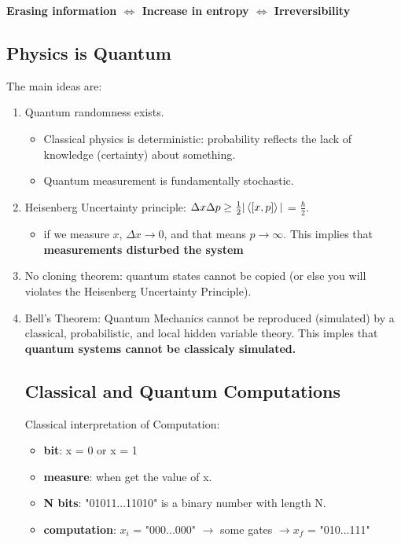\documentclass[12pt]{article}
\begin{document}
\textbf{\color{Orchid} Erasing information $\Longleftrightarrow$ Increase in entropy $\Longleftrightarrow$ Irreversibility}

\subsection{Physics is Quantum}

The main ideas are:
\begin{enumerate}
    \item Quantum randomness exists.
    \begin{itemize}
        \item Classical physics is deterministic: probability reflects the lack of knowledge (certainty) about something.
        \item Quantum measurement is fundamentally stochastic.
    \end{itemize}
    \item Heisenberg Uncertainty principle: $\Delta x \Delta p \ge \frac{1}{2}|\braket{[x, p]}|$ = $\frac{\hbar}{2}$.
    \begin{itemize}
        \item if we measure $x$, $\Delta x \rightarrow{} 0$, and that means $p \xrightarrow{} \infty$. This implies that \textbf{\color{Orchid} measurements disturbed the system}
    \end{itemize}
    \item No cloning theorem: quantum states cannot be copied (or else you will violates the Heisenberg Uncertainty Principle).
    \item Bell's Theorem: Quantum Mechanics cannot be reproduced (simulated) by a classical, probabilistic, and local hidden variable theory. This imples that \textbf{\color{Orchid} quantum systems cannot be classicaly simulated.}

\subsection{Classical and Quantum Computations}
Classical interpretation of Computation:
\begin{itemize}
    \item \textbf{bit}: x = 0 or x = 1
    \item \textbf{measure}: when get the value of x.
    \item \textbf{N bits}: "01011...11010" is a binary number with length N.
    \item \textbf{computation}: $x_i$ = "000...000" $\rightarrow{}$ some gates $\rightarrow{} x_f$ = "010...111"
\end{itemize}


\end{enumerate}
\end{document}
